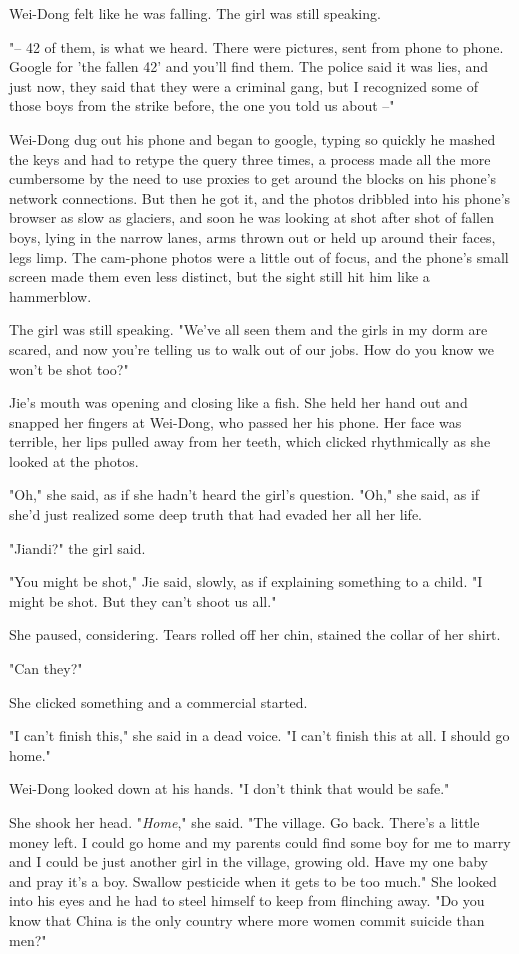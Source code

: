 Wei-Dong felt like he was falling. The girl was still speaking.

"-- 42 of them, is what we heard. There were pictures, sent from
phone to phone. Google for 'the fallen 42' and you'll find them.
The police said it was lies, and just now, they said that they were
a criminal gang, but I recognized some of those boys from the
strike before, the one you told us about --"

Wei-Dong dug out his phone and began to google, typing so quickly
he mashed the keys and had to retype the query three times, a
process made all the more cumbersome by the need to use proxies to
get around the blocks on his phone's network connections. But then
he got it, and the photos dribbled into his phone's browser as slow
as glaciers, and soon he was looking at shot after shot of fallen
boys, lying in the narrow lanes, arms thrown out or held up around
their faces, legs limp. The cam-phone photos were a little out of
focus, and the phone's small screen made them even less distinct,
but the sight still hit him like a hammerblow.

The girl was still speaking. "We've all seen them and the girls in
my dorm are scared, and now you're telling us to walk out of our
jobs. How do you know we won't be shot too?"

Jie's mouth was opening and closing like a fish. She held her hand
out and snapped her fingers at Wei-Dong, who passed her his phone.
Her face was terrible, her lips pulled away from her teeth, which
clicked rhythmically as she looked at the photos.

"Oh," she said, as if she hadn't heard the girl's question. "Oh,"
she said, as if she'd just realized some deep truth that had evaded
her all her life.

"Jiandi?" the girl said.

"You might be shot," Jie said, slowly, as if explaining something
to a child. "I might be shot. But they can't shoot us all."

She paused, considering. Tears rolled off her chin, stained the
collar of her shirt.

"Can they?"

She clicked something and a commercial started.

"I can't finish this," she said in a dead voice. "I can't finish
this at all. I should go home."

Wei-Dong looked down at his hands. "I don't think that would be
safe."

She shook her head. "\emph{Home}," she said. "The village. Go back.
There's a little money left. I could go home and my parents could
find some boy for me to marry and I could be just another girl in
the village, growing old. Have my one baby and pray it's a boy.
Swallow pesticide when it gets to be too much." She looked into his
eyes and he had to steel himself to keep from flinching away. "Do
you know that China is the only country where more women commit
suicide than men?"


